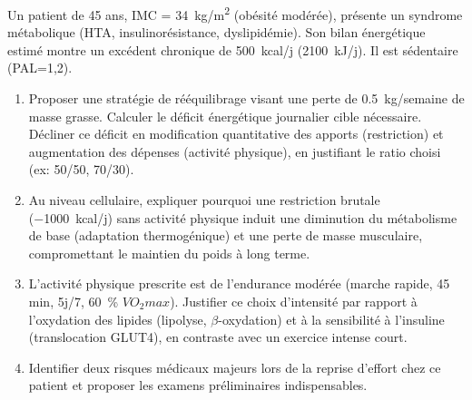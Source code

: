 \documentclass[11pt]{article}
\begin{document}
\begin{exercice}
Un patient de 45 ans, IMC = \SI{34}{kg/m^2} (obésité modérée), présente un syndrome métabolique (HTA, insulinorésistance, dyslipidémie). Son bilan énergétique estimé montre un excédent chronique de \SI{+500}{kcal/j} (\SI{+2100}{kJ/j}). Il est sédentaire (PAL=1,2).
\begin{enumerate}
    \item Proposer une stratégie de rééquilibrage visant une perte de \SI{0,5}{kg/semaine} de masse grasse. Calculer le déficit énergétique journalier cible nécessaire. Décliner ce déficit en modification quantitative des apports (restriction) et augmentation des dépenses (activité physique), en justifiant le ratio choisi (ex: 50/50, 70/30).
    \item Au niveau cellulaire, expliquer pourquoi une restriction brutale (\SI{-1000}{kcal/j}) sans activité physique induit une diminution du métabolisme de base (adaptation thermogénique) et une perte de masse musculaire, compromettant le maintien du poids à long terme.
    \item L'activité physique prescrite est de l'endurance modérée (marche rapide, 45 min, 5j/7, \SI{60}{\%} $VO_2max$). Justifier ce choix d'intensité par rapport à l'oxydation des lipides (lipolyse, $\beta$-oxydation) et à la sensibilité à l'insuline (translocation GLUT4), en contraste avec un exercice intense court.
    \item Identifier deux risques médicaux majeurs lors de la reprise d'effort chez ce patient et proposer les examens préliminaires indispensables.
\end{enumerate}
\end{exercice}
\end{document}
